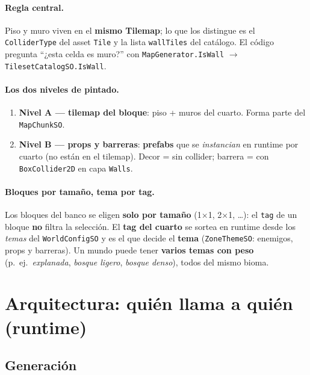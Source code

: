 \documentclass[11pt,a4paper]{article}
\newcommand{\asset}[1]{\texttt{#1}}
\newcommand{\code}[1]{\texttt{#1}}
\begin{document}
\paragraph{Regla central.} Piso y muro viven en el \textbf{mismo Tilemap}; lo que los distingue es el
\code{ColliderType} del asset \code{Tile} y la lista \code{wallTiles} del catálogo. El código pregunta
``¿esta celda es muro?'' con \code{MapGenerator.IsWall} $\rightarrow$ \code{TilesetCatalogSO.IsWall}.

\paragraph{Los dos niveles de pintado.}
\begin{enumerate}[leftmargin=1.4em]
  \item \textbf{Nivel A --- tilemap del bloque}: piso + muros del cuarto. Forma parte del \asset{MapChunkSO}.
  \item \textbf{Nivel B --- props y barreras}: \textbf{prefabs} que se \emph{instancian} en runtime por cuarto
        (no están en el tilemap). Decor = sin collider; barrera = con \code{BoxCollider2D} en capa \code{Walls}.
\end{enumerate}

\paragraph{Bloques por tamaño, tema por tag.} Los bloques del banco se eligen \textbf{solo por tamaño}
(1$\times$1, 2$\times$1, \ldots): el \code{tag} de un bloque \textbf{no} filtra la selección. El \textbf{tag del
cuarto} se sortea en runtime desde los \emph{temas} del \code{WorldConfigSO} y es el que decide el
\textbf{tema} (\code{ZoneThemeSO}: enemigos, props y barreras). Un mundo puede tener \textbf{varios temas
con peso} (p.\ ej.\ \emph{explanada}, \emph{bosque ligero}, \emph{bosque denso}), todos del mismo bioma.

\section{Arquitectura: quién llama a quién (runtime)}

\subsection{Generación}
\end{document}
